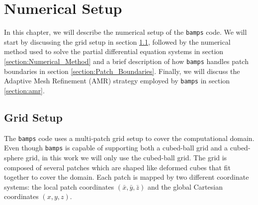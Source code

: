 
\chapter{Numerical Setup}
\label{chapter:numerical_setup}

In this chapter, we will describe the numerical setup of the \texttt{bamps} code. We will start by discussing the grid setup in section \ref{section:grid}, followed by the numerical method used to solve the partial differential equation systems in section \ref{section:Numerical_Method} and a brief description of how \texttt{bamps} handles patch boundaries in section \ref{section:Patch_Boundaries}. Finally, we will discuss the Adaptive Mesh Refinement (AMR) strategy employed by \texttt{bamps} in section \ref{section:amr}.

\section{Grid Setup}
\label{section:grid}

The \texttt{bamps} code uses a multi-patch grid setup to cover the computational domain. Even though \texttt{bamps} is capable of supporting both a cubed-ball grid and a cubed-sphere grid, in this work we will only use the cubed-ball grid. The grid is composed of several patches which are shaped like deformed cubes that fit together to cover the domain. Each patch is mapped by two different coordinate systems: the local patch coordinates $(\bar{x},\bar{y},\bar{z})$ and the global Cartesian coordinates $(x,y,z)$.

